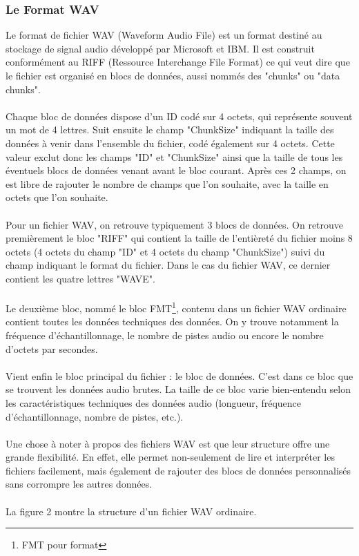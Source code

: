 \documentclass[11pt]{article}
\begin{document}
\subsubsection{Le Format WAV}


Le format de fichier WAV (Waveform Audio File) est un format destiné au stockage de signal audio développé par Microsoft et IBM.
Il est construit conformément au RIFF (Ressource Interchange File Format) ce qui veut dire que le fichier est organisé en blocs de données, aussi nommés des "chunks" ou "data chunks".\\
\\
Chaque bloc de données dispose d'un ID codé sur 4 octets, qui représente souvent un mot de 4 lettres.
Suit ensuite le champ "ChunkSize" indiquant la taille des données à venir dans l'ensemble du fichier, codé également sur 4 octets.
Cette valeur exclut donc les champs "ID" et "ChunkSize" ainsi que la taille de tous les éventuels blocs de données venant avant le bloc courant.
Après ces 2 champs, on est libre de rajouter le nombre de champs que l'on souhaite, avec la taille en octets que l'on souhaite.\\
\\
Pour un fichier WAV, on retrouve typiquement 3 blocs de données.
On retrouve premièrement le bloc "RIFF" qui contient la taille de l'entièreté du fichier moins 8 octets (4 octets du champ "ID" et 4 octets du champ "ChunkSize") suivi du champ indiquant le format du fichier.
Dans le cas du fichier WAV, ce dernier contient les quatre lettres "WAVE".\\
\\
Le deuxième bloc, nommé le bloc FMT\footnote{FMT pour format}, contenu dans un fichier WAV ordinaire contient toutes les données techniques des données.
On y trouve notamment la fréquence d'échantillonnage, le nombre de pistes audio ou encore le nombre d'octets par secondes.\\
\\
Vient enfin le bloc principal du fichier : le bloc de données.
C'est dans ce bloc que se trouvent les données audio brutes.
La taille de ce bloc varie bien-entendu selon les caractéristiques techniques des données audio (longueur, fréquence d'échantillonnage, nombre de pistes, etc.).\\
\\
Une chose à noter à propos des fichiers WAV est que leur structure offre une grande flexibilité.
En effet, elle permet non-seulement de lire et interpréter les fichiers facilement, mais également de rajouter des blocs de données personnalisés sans corrompre les autres données.\\
\\
La figure 2 montre la structure d'un fichier WAV ordinaire.
\end{document}

